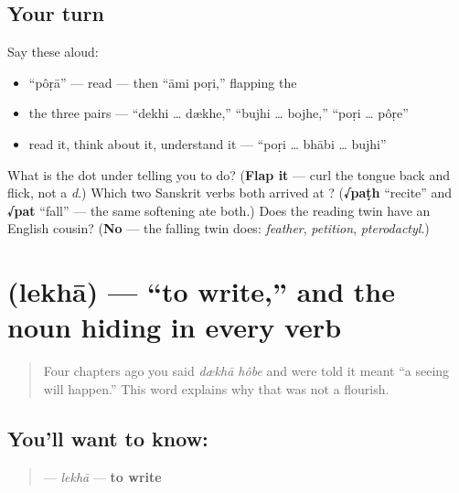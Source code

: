\subsection*{Your turn}
Say these aloud:

\begin{itemize}
\raggedright
  \item \textquotedblleft{}pôṛā\textquotedblright{} — read — then \textquotedblleft{}āmi poṛi,\textquotedblright{} flapping the 
  \item the three pairs — \textquotedblleft{}dekhi … dækhe,\textquotedblright{} \textquotedblleft{}bujhi … bojhe,\textquotedblright{} \textquotedblleft{}poṛi … pôṛe\textquotedblright{}
  \item read it, think about it, understand it — \textquotedblleft{}poṛi … bhābi … bujhi\textquotedblright{}
\end{itemize}

\begin{tcolorbox}[breakable,colback=teal!4,colframe=teal!35!black,title={Before you move on}]
What is the dot under \textbf{} telling you to do? (\textbf{Flap it} — curl the tongue back and flick, not a \emph{d}.) Which two Sanskrit verbs both arrived at ? (\textbf{√paṭh} \textquotedblleft{}recite\textquotedblright{} and \textbf{√pat} \textquotedblleft{}fall\textquotedblright{} — the same softening ate both.) Does the reading twin have an English cousin? (\textbf{No} — the falling twin does: \emph{feather}, \emph{petition}, \emph{pterodactyl}.)
\end{tcolorbox}
\section[\texorpdfstring{\bn{লেখা} (lekhā)}{লেখা (lekhā)}]{ (lekhā) — \textquotedblleft{}to write,\textquotedblright{} and the noun hiding in every verb}

\label{lesson:BN-C08-lekha}



\begin{quote}
Four chapters ago you said \emph{dækhā hôbe} and were told it meant \textquotedblleft{}a seeing will happen.\textquotedblright{} This word explains why that was not a flourish.
\end{quote}

\subsection*{You'll want to know: }
\begin{quote}
\textbf{} — \emph{lekhā} — \textbf{to write}
\end{quote}

